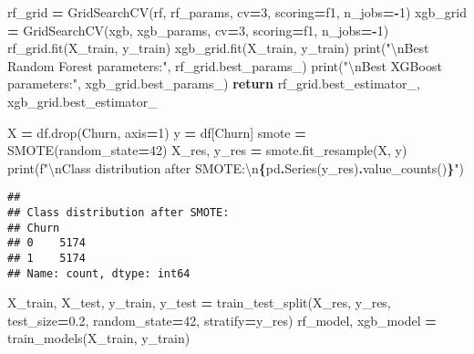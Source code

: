 \documentclass[preprint, 3p,
authoryear]{elsarticle} %
\newenvironment{Shaded}{\begin{snugshade}}{\end{snugshade}}
\newcommand{\BuiltInTok}[1]{#1}
\newcommand{\CharTok}[1]{\textcolor[rgb]{0.31,0.60,0.02}{#1}}
\newcommand{\ControlFlowTok}[1]{\textcolor[rgb]{0.13,0.29,0.53}{\textbf{#1}}}
\newcommand{\DecValTok}[1]{\textcolor[rgb]{0.00,0.00,0.81}{#1}}
\newcommand{\FloatTok}[1]{\textcolor[rgb]{0.00,0.00,0.81}{#1}}
\newcommand{\NormalTok}[1]{#1}
\newcommand{\OperatorTok}[1]{\textcolor[rgb]{0.81,0.36,0.00}{\textbf{#1}}}
\newcommand{\SpecialCharTok}[1]{\textcolor[rgb]{0.81,0.36,0.00}{\textbf{#1}}}
\newcommand{\SpecialStringTok}[1]{\textcolor[rgb]{0.31,0.60,0.02}{#1}}
\newcommand{\StringTok}[1]{\textcolor[rgb]{0.31,0.60,0.02}{#1}}
\begin{document}
\begin{Shaded}
\begin{Highlighting}[]
\NormalTok{    rf\_grid }\OperatorTok{=}\NormalTok{ GridSearchCV(rf, rf\_params, cv}\OperatorTok{=}\DecValTok{3}\NormalTok{, scoring}\OperatorTok{=}\StringTok{\textquotesingle{}f1\textquotesingle{}}\NormalTok{, n\_jobs}\OperatorTok{={-}}\DecValTok{1}\NormalTok{)}
\NormalTok{    xgb\_grid }\OperatorTok{=}\NormalTok{ GridSearchCV(xgb, xgb\_params, cv}\OperatorTok{=}\DecValTok{3}\NormalTok{, scoring}\OperatorTok{=}\StringTok{\textquotesingle{}f1\textquotesingle{}}\NormalTok{, n\_jobs}\OperatorTok{={-}}\DecValTok{1}\NormalTok{)}
\NormalTok{    rf\_grid.fit(X\_train, y\_train)}
\NormalTok{    xgb\_grid.fit(X\_train, y\_train)}
    \BuiltInTok{print}\NormalTok{(}\StringTok{"}\CharTok{\textbackslash{}n}\StringTok{Best Random Forest parameters:"}\NormalTok{, rf\_grid.best\_params\_)}
    \BuiltInTok{print}\NormalTok{(}\StringTok{"}\CharTok{\textbackslash{}n}\StringTok{Best XGBoost parameters:"}\NormalTok{, xgb\_grid.best\_params\_)}
    \ControlFlowTok{return}\NormalTok{ rf\_grid.best\_estimator\_, xgb\_grid.best\_estimator\_}

\NormalTok{X }\OperatorTok{=}\NormalTok{ df.drop(}\StringTok{\textquotesingle{}Churn\textquotesingle{}}\NormalTok{, axis}\OperatorTok{=}\DecValTok{1}\NormalTok{)}
\NormalTok{y }\OperatorTok{=}\NormalTok{ df[}\StringTok{\textquotesingle{}Churn\textquotesingle{}}\NormalTok{]}
\NormalTok{smote }\OperatorTok{=}\NormalTok{ SMOTE(random\_state}\OperatorTok{=}\DecValTok{42}\NormalTok{)}
\NormalTok{X\_res, y\_res }\OperatorTok{=}\NormalTok{ smote.fit\_resample(X, y)}
\BuiltInTok{print}\NormalTok{(}\SpecialStringTok{f"}\CharTok{\textbackslash{}n}\SpecialStringTok{Class distribution after SMOTE:}\CharTok{\textbackslash{}n}\SpecialCharTok{\{}\NormalTok{pd}\SpecialCharTok{.}\NormalTok{Series(y\_res)}\SpecialCharTok{.}\NormalTok{value\_counts()}\SpecialCharTok{\}}\SpecialStringTok{"}\NormalTok{)}
\end{Highlighting}
\end{Shaded}

\begin{verbatim}
## 
## Class distribution after SMOTE:
## Churn
## 0    5174
## 1    5174
## Name: count, dtype: int64
\end{verbatim}

\begin{Shaded}
\begin{Highlighting}[]
\NormalTok{X\_train, X\_test, y\_train, y\_test }\OperatorTok{=}\NormalTok{ train\_test\_split(X\_res, y\_res, test\_size}\OperatorTok{=}\FloatTok{0.2}\NormalTok{, random\_state}\OperatorTok{=}\DecValTok{42}\NormalTok{, stratify}\OperatorTok{=}\NormalTok{y\_res)}
\NormalTok{rf\_model, xgb\_model }\OperatorTok{=}\NormalTok{ train\_models(X\_train, y\_train)}
\end{Highlighting}
\end{Shaded}
\end{document}
